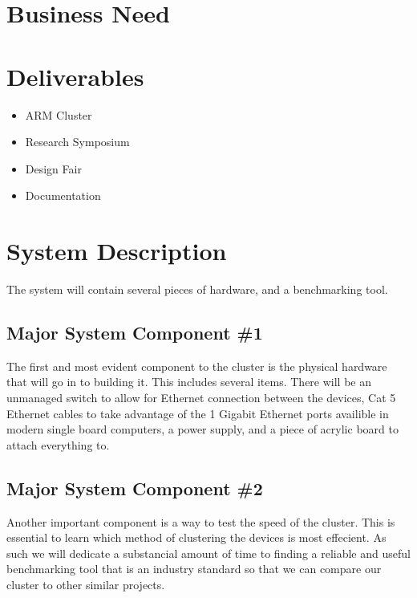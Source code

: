\section{Business Need}



\section{Deliverables}

\begin{itemize}
	\item ARM Cluster
	\item Research Symposium
	\item Design Fair
	\item Documentation
\end{itemize}

\section{System Description}

The system will contain several pieces of hardware, and a benchmarking tool. 

\subsection{Major System Component \#1}

The first and most evident component to the cluster is the physical hardware that will go in to building it. This includes several items. There will be an unmanaged switch to allow for Ethernet connection between the devices, Cat 5 Ethernet cables to take advantage of the 1 Gigabit Ethernet ports availible in modern single board computers, a power supply, and a piece of acrylic board to attach everything to. 

\subsection{Major System Component \#2}

Another important component is a way to test the speed of the cluster. This is essential to learn which method of clustering the devices is most effecient. As such we will dedicate a substancial amount of time to finding a reliable and useful benchmarking tool that is an industry standard so that we can compare our cluster to other similar projects.


